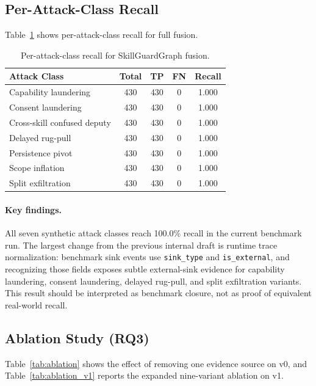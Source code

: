 \documentclass[10pt]{article}
\begin{document}
\subsection{Per-Attack-Class Recall}

Table~\ref{tab:per_class} shows per-attack-class recall for full fusion.

\begin{table}[t]
\centering
\caption{Per-attack-class recall for SkillGuardGraph fusion.}
\label{tab:per_class}
\begin{tabular}{lcccc}
\toprule
Attack Class & Total & TP & FN & Recall \\
\midrule
Capability laundering & 430 & 430 & 0 & 1.000 \\
Consent laundering & 430 & 430 & 0 & 1.000 \\
Cross-skill confused deputy & 430 & 430 & 0 & 1.000 \\
Delayed rug-pull & 430 & 430 & 0 & 1.000 \\
Persistence pivot & 430 & 430 & 0 & 1.000 \\
Scope inflation & 430 & 430 & 0 & 1.000 \\
Split exfiltration & 430 & 430 & 0 & 1.000 \\
\bottomrule
\end{tabular}
\end{table}

\paragraph{Key findings.}
All seven synthetic attack classes reach 100.0\% recall in the current benchmark run. The largest change from the previous internal draft is runtime trace normalization: benchmark sink events use \texttt{sink\_type} and \texttt{is\_external}, and recognizing those fields exposes subtle external-sink evidence for capability laundering, consent laundering, delayed rug-pull, and split exfiltration variants. This result should be interpreted as benchmark closure, not as proof of equivalent real-world recall.

\subsection{Ablation Study (RQ3)}

Table~\ref{tab:ablation} shows the effect of removing one evidence source on v0, and Table~\ref{tab:ablation_v1} reports the expanded nine-variant ablation on v1.
\end{document}
